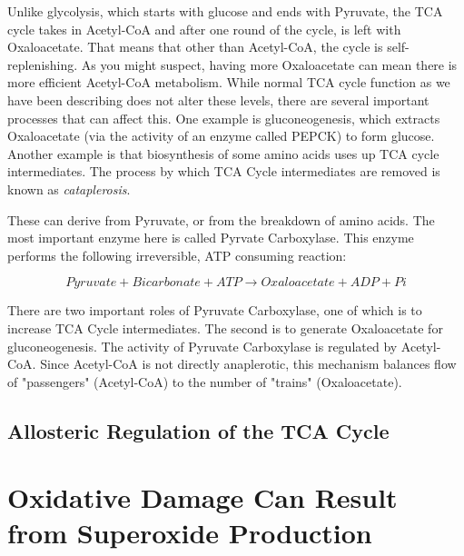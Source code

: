 \documentclass{tufte-handout}
\begin{document}
  Unlike glycolysis, which starts with glucose and ends with Pyruvate, the TCA cycle takes in Acetyl-CoA and after one round of the cycle, is left with Oxaloacetate.  That means that other than Acetyl-CoA, the cycle is self-replenishing.  As you might suspect, having more Oxaloacetate can mean there is more efficient Acetyl-CoA metabolism.  While normal TCA cycle function as we have been describing does not alter these levels, there are several important processes that can affect this.  One example is gluconeogenesis, which extracts Oxaloacetate (via the activity of an enzyme called PEPCK) to form glucose.  Another example is that biosynthesis of some amino acids uses up TCA cycle intermediates.  The process by which TCA Cycle intermediates are removed is known as \emph{cataplerosis}.

  These can derive from Pyruvate, or from the breakdown of amino acids.  The most important enzyme here is called Pyrvate Carboxylase.  This enzyme performs the following irreversible, ATP consuming reaction:

\begin{equation}\label{eq:pcx}
Pyruvate + Bicarbonate + ATP \rightarrow Oxaloacetate + ADP + Pi
\end{equation}

There are two important roles of Pyruvate Carboxylase, one of which is to increase TCA Cycle intermediates.  The second is to generate Oxaloacetate for gluconeogenesis.  The activity of Pyruvate Carboxylase is regulated by Acetyl-CoA.  Since Acetyl-CoA is not directly anaplerotic, this mechanism balances flow of "passengers" (Acetyl-CoA) to the number of "trains" (Oxaloacetate).  

\subsection{Allosteric Regulation of the TCA Cycle}


\section{Oxidative Damage Can Result from Superoxide Production}




\end{document}
